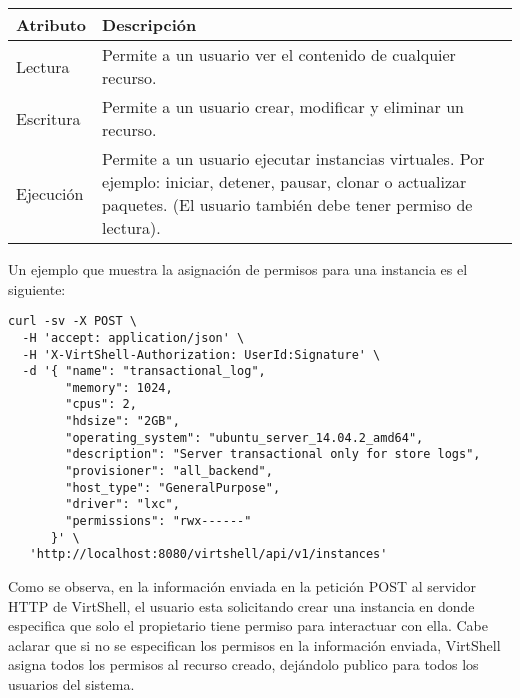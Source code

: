 \begin{center}
 \begin{tabular}{| l | p{12cm} |}
 \hline
  \rowcolor{blueapi}
  \textbf{Atributo} & \textbf{Descripción}  \\ [0.2ex] 
  \hline\hline
  Lectura &  Permite a un usuario ver el contenido de cualquier recurso. \\
  \hline
  Escritura & Permite a un usuario crear, modificar y eliminar un recurso. \\  
  \hline
  Ejecución & Permite a un usuario ejecutar instancias virtuales. 
  Por ejemplo: iniciar, detener, pausar, clonar o actualizar paquetes. 
   (El usuario también debe tener permiso de lectura). \\
  \hline
\end{tabular}
\end{center}

\vspace{5mm}

Un ejemplo que muestra la asignación de permisos para una instancia es el siguiente:

\vspace{5mm}

\medskip
\begin{lstlisting}[style=json]
curl -sv -X POST \
  -H 'accept: application/json' \
  -H 'X-VirtShell-Authorization: UserId:Signature' \
  -d '{ "name": "transactional_log",
        "memory": 1024,
        "cpus": 2,
        "hdsize": "2GB",
        "operating_system": "ubuntu_server_14.04.2_amd64",
        "description": "Server transactional only for store logs", 
        "provisioner": "all_backend",
        "host_type": "GeneralPurpose",
        "driver": "lxc",
        "permissions": "rwx------"
      }' \
   'http://localhost:8080/virtshell/api/v1/instances'
\end{lstlisting}

\vspace{5mm}

Como se observa, en la información enviada en la petición POST al servidor HTTP de VirtShell, el usuario esta solicitando crear una instancia en donde especifica que solo el propietario tiene permiso para interactuar con ella. Cabe aclarar que si no se especifican los permisos en la información enviada, VirtShell asigna todos los permisos al recurso creado, dejándolo publico para todos los usuarios del sistema.
